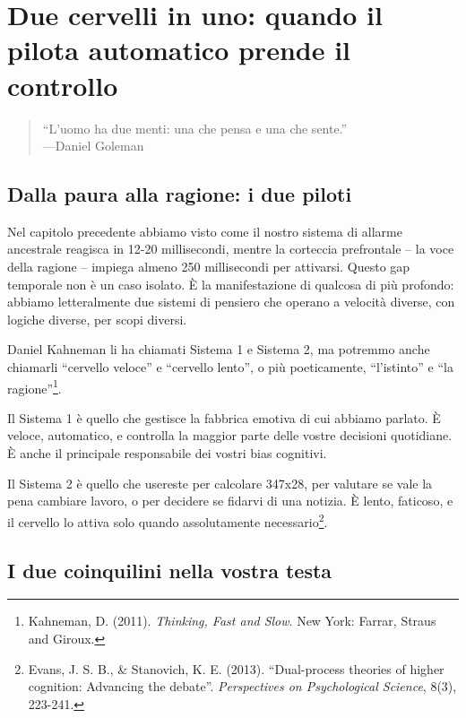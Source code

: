\chapter{Due cervelli in uno: quando il pilota automatico prende il controllo}

\begin{quotation}
``L'uomo ha due menti: una che pensa e una che sente.''\\
---Daniel Goleman
\end{quotation}

\section{Dalla paura alla ragione: i due piloti}

Nel capitolo precedente abbiamo visto come il nostro sistema di allarme ancestrale reagisca in 12-20 millisecondi, mentre la corteccia prefrontale -- la voce della ragione -- impiega almeno 250 millisecondi per attivarsi. Questo gap temporale non è un caso isolato. È la manifestazione di qualcosa di più profondo: abbiamo letteralmente due sistemi di pensiero che operano a velocità diverse, con logiche diverse, per scopi diversi.

Daniel Kahneman li ha chiamati Sistema 1 e Sistema 2, ma potremmo anche chiamarli ``cervello veloce'' e ``cervello lento'', o più poeticamente, ``l'istinto'' e ``la ragione''\footnote{Kahneman, D. (2011). \textit{Thinking, Fast and Slow}. New York: Farrar, Straus and Giroux.}.

Il Sistema 1 è quello che gestisce la fabbrica emotiva di cui abbiamo parlato. È veloce, automatico, e controlla la maggior parte delle vostre decisioni quotidiane. È anche il principale responsabile dei vostri bias cognitivi.

Il Sistema 2 è quello che usereste per calcolare 347x28, per valutare se vale la pena cambiare lavoro, o per decidere se fidarvi di una notizia. È lento, faticoso, e il cervello lo attiva solo quando assolutamente necessario\footnote{Evans, J. S. B., \& Stanovich, K. E. (2013). ``Dual-process theories of higher cognition: Advancing the debate''. \textit{Perspectives on Psychological Science}, 8(3), 223-241.}.

\section{I due coinquilini nella vostra testa}

